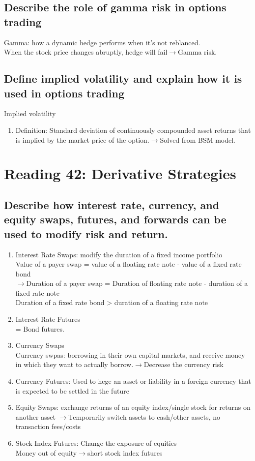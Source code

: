 \documentclass{article}
\newcommand{\be}{\begin{enumerate}}
\newcommand{\ee}{\end{enumerate}}
\newcommand{\ra}{$\rightarrow$}
\begin{document}
\subsection{Describe the role of gamma risk in options trading}
Gamma: how a dynamic hedge performs when it's not reblanced.
\\When the stock price changes abruptly, hedge will fail\ra Gamma risk.
\subsection{Define implied volatility and explain how it is used in options trading}
Implied volatility
\be
    \item Definition: Standard deviation of continuously compounded asset returns
    that is implied by the market price of the option.\ra Solved from BSM model.
\ee


\section{Reading 42: Derivative Strategies}
\subsection{Describe how interest rate, currency, and equity swaps, futures, and
forwards can be used to modify risk and return.}
\be
    \item Interest Rate Swaps: modify the duration of a fixed income portfolio
        \\ Value of a payer swap = value of a floating rate note - value of a fixed rate bond
        \\\ra Duration of a payer swap = Duration of floating rate note - duration of a fixed rate note
        \\ Duration of a fixed rate bond > duration of a floating rate note
    \item Interest Rate Futures
        \\ = Bond futures.
    \item Currency Swaps
        \\ Currency swpas: borrowing in their own capital markets, and receive
        money in which they want to actually borrow.\ra Decrease the currency risk
    \item Currency Futures: Used to hege an asset or liability in a foreign currency that
    is expected to be settled in the future
    \item Equity Swaps: exchange returns of an equity index/single stock for returns
    on another asset \ra Temporarily switch assets to cash/other assets, no transaction fees/costs
    \item Stock Index Futures: Change the exposure of equities
        \\ Money out of equity\ra short stock index futures
\ee
\end{document}
